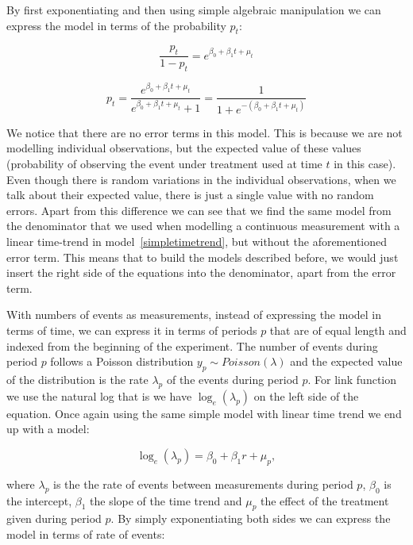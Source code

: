 \documentclass[12pt,a4paper,leqno]{report}
\theoremstyle{plain}
\theoremstyle{definition}
\theoremstyle{remark}
\begin{document}
By first exponentiating and then using simple algebraic manipulation we can express the
model in terms of the probability \(p_t\):

\begin{def}\label{}
    \begin{equation}\label{}
        \frac{p_t}{1-p_t}=e^{\beta_0 + \beta_1 t + \mu_t}
    \end{equation}
\end{def}

\begin{def}\label{}
    \begin{equation}\label{}
        p_t=\frac{e^{\beta_0 + \beta_1 t + \mu_t}}{e^{\beta_0 + \beta_1 t + \mu_t}+1}=\frac{1}{1+e^{-(\beta_0 + \beta_1 t + \mu_t)}}
    \end{equation}
\end{def}

We notice that there are no error terms in this model. This is because we are not
modelling individual observations, but the expected value of these values (probability of
observing the event under treatment used at time \(t\) in this case). Even though there
is random variations in the individual observations, when we talk about their expected
value, there is just a single value with no random errors. Apart from this difference we
can see that we find the same model from the denominator that we used when modelling a
continuous measurement with a linear time-trend in model\ \ref{simpletimetrend}, but
without the aforementioned error term. This means that to build the models described
before, we would just insert the right side of the equations into the denominator, apart
from the error term.

With numbers of events as measurements, instead of expressing the model in terms of time,
we can express it in terms of periods \(p\) that are of equal length and indexed from the
beginning of the experiment. The number of events during period \(p\) follows a Poisson
distribution \(y_p \sim Poisson(\lambda)\) and the expected value of the distribution is
the rate \(\lambda_p \) of the events during period \(p\). For link function we use the
natural log that is we have \(\log_e(\lambda_p)\) on the left side of the equation. Once
again using the same simple model with linear time trend we end up with a model:

\begin{def}\label{oneerror}
    \begin{equation}
        \log_e(\lambda_p)=\beta_0 + \beta_1 r + \mu_{p},
    \end{equation}
\end{def}where \(\lambda_p\) is the the rate of events between measurements during period
\(p\), \(\beta_0\) is the intercept, \(\beta_1\) the slope of the time trend and
\(\mu_p\) the effect of the treatment given during period \(p\). By simply exponentiating
both sides we can express the model in terms of rate of events:
\end{document}
